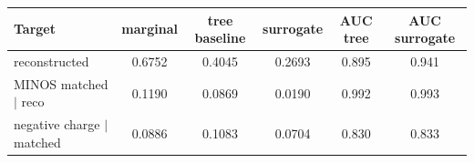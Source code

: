\begin{tabular}{lccccc}
\toprule
Target & marginal & tree baseline & surrogate & AUC tree & AUC surrogate \\
\midrule
reconstructed & 0.6752 & 0.4045 & 0.2693 & 0.895 & 0.941 \\
MINOS matched $\mid$ reco & 0.1190 & 0.0869 & 0.0190 & 0.992 & 0.993 \\
negative charge $\mid$ matched & 0.0886 & 0.1083 & 0.0704 & 0.830 & 0.833 \\
\bottomrule
\end{tabular}
